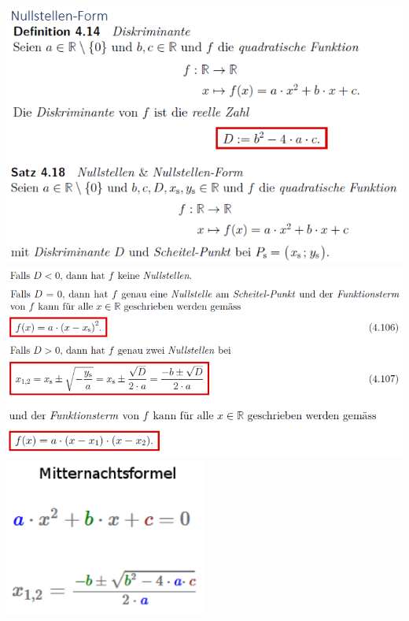 \includegraphics[width=\columnwidth]{./images/quad3.png}
\includegraphics[width=\columnwidth]{./images/quad4.png}
\includegraphics[width=\columnwidth]{./images/quad5.png}
